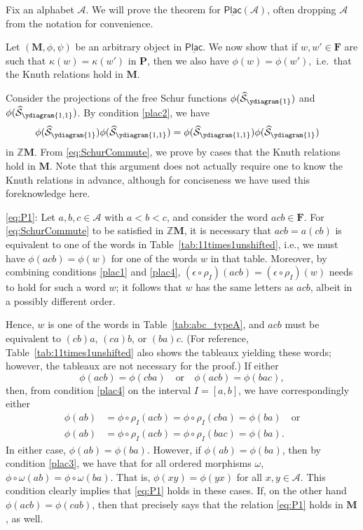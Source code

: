 \documentclass[12 pt]{amsart}
\newcommand{\Plactic}{{\mathbf{P}}}
\newcommand{\Free}{\mathbf{F}}
\newcommand{\Monoid}{\mathbf{M}}
\newcommand{\LSCategory}{\underline{\mathsf{Plac}}}
\newcommand{\FreeSchur}{\widehat{\mathcal{S}}}
\newcommand{\cA}{\mathcal{A}}
\theoremstyle{remark}
\numberwithin{equation}{section}
\begin{document}
Fix an alphabet $\cA$. We will prove the theorem for $\LSCategory(\cA)$, often dropping $\cA$ from the notation for convenience.

Let $(\Monoid, \phi, \psi)$ be an arbitrary object in $\LSCategory$.
We now show that if $w, w' \in \Free$ are such that $\kappa(w) = \kappa(w')$ in $\Plactic$, then we also have $\phi(w)=\phi(w'),$ i.e.\ that the Knuth relations hold in $\Monoid$.

Consider the projections of the free Schur functions $\phi(\FreeSchur_{\ydiagram{1}})$ and $ \phi(\FreeSchur_{\ydiagram{1,1}})$. By condition \ref{plac2}, we have
\begin{align}
    \phi(\FreeSchur_{\ydiagram{1}})\phi(\FreeSchur_{\ydiagram{1,1}}) &= \phi(\FreeSchur_{\ydiagram{1,1}}) \phi(\FreeSchur_{\ydiagram{1}}) \label{eq:SchurCommute}
\end{align}
in $\mathbb{Z}\Monoid$. From \eqref{eq:SchurCommute}, we prove by cases that the Knuth relations hold in $\Monoid$. Note that this argument does not actually require one to know the Knuth relations in advance, although for conciseness we have used this foreknowledge here.

\medskip
\eqref{eq:P1}:
Let $a,b,c \in \cA$ with $a < b< c$, and consider the word $acb\in \Free$. For \eqref{eq:SchurCommute} to be satisfied in $\mathbb{Z}\Monoid$, it is necessary that $acb=a(cb)$ is equivalent to one of the words in Table~\ref{tab:11times1unshifted}, i.e., we must have $\phi(acb)=\phi(w)$ for one of the words $w$ in that table.
Moreover, by combining conditions \ref{plac1} and \ref{plac4}, $(\epsilon \circ \rho_I)(acb)=(\epsilon \circ \rho_I)(w)$ needs to hold for such a word $w$; it follows that $w$ has the same letters as $acb$, albeit in a possibly different order. 

Hence, $w$ is one of the words in Table~\ref{tab:abc_typeA}, and $acb$ must be equivalent to $(cb)a$, $(ca)b$, or $(ba)c$. (For reference, Table~\ref{tab:11times1unshifted} also shows the tableaux yielding these words; however, the tableaux are not necessary for the proof.) If either \[
\phi(acb)= \phi(cba) \quad \text{or} \quad \phi(acb)= \phi(bac),
\]
then, from condition \ref{plac4} on the interval $I=[a,b]$, we have correspondingly either
\begin{align*}
  \phi(ab)&=\phi \circ \rho_I(acb) = \phi \circ \rho_I(cba) = \phi(ba) \quad \text{or} \\
\phi(ab)&=\phi \circ \rho_I(acb)= \phi \circ \rho_I(bac) =\phi(ba).
\end{align*}
In either case, $\phi(ab) = \phi(ba)$.
However, if $\phi(ab)= \phi(ba)$, then by condition \ref{plac3}, we have that for all ordered morphisms $\omega$, $\phi\circ \omega (ab) = \phi \circ \omega (ba).$ That is, $\phi(xy)=\phi(yx)$ for all $x,y \in \cA$. 
This condition clearly implies that \eqref{eq:P1} holds in these cases.
If, on the other hand $\phi(acb)=\phi(cab)$, then that precisely says that the relation \eqref{eq:P1} holds in $\Monoid$, as well. 
\end{document}
